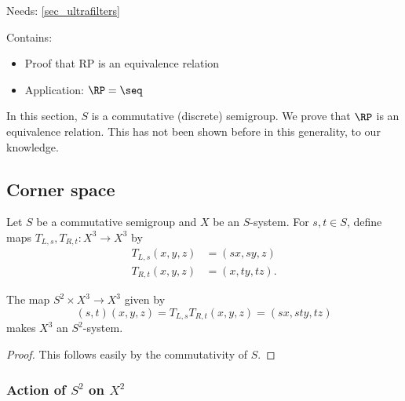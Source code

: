 Needs: \cref{sec_ultrafilters}

Contains:
\begin{itemize}
    \item Proof that RP is an equivalence relation
    \item Application: $\RP = \seq$
\end{itemize}

In this section, $S$ is a commutative (discrete) semigroup.  We prove that $\RP$ is an equivalence relation.  This has not been shown before in this generality, to our knowledge.

\subsection{Corner space}
\label{sec_corner_space}


Let $S$ be a commutative semigroup and $X$ be an $S$-system.  For $s, t \in S$, define maps $T_{L,s}, T_{R,t}: X^3 \to X^3$ by
\begin{align*}
    T_{L,s}(x,y,z) &= (sx, sy, z)\\
    T_{R,t}(x,y,z) &= (x, ty, tz).
\end{align*}

\begin{lemma}[Action of $S^2$ on $X^3$]
\label{lemma_S2_action_on_X3}
\leanok{}
    The map $S^2 \times X^3 \to X^3$ given by
    \[(s,t)(x,y,z) = T_{L,s}T_{R,t}(x,y,z) = (sx,sty,tz)\]
    makes $X^3$ an $S^2$-system.
\end{lemma}

\begin{proof}
\leanok{}
    This follows easily by the commutativity of $S$.
\end{proof}


\subsubsection{Action of $S^2$ on $X^2$}

